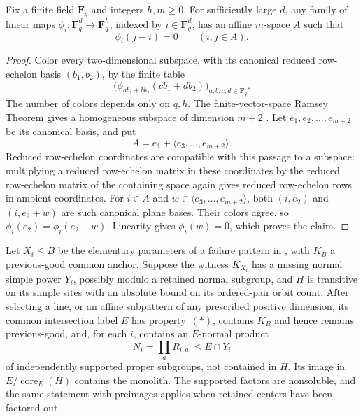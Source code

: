 \begin{lemma}\label{r:affine-kernels}
Fix a finite field $\mathbf F_q$ and integers $h,m\ge0$.
For sufficiently large $d$, any family of linear maps
$\phi_i:\mathbf F_q^d\longrightarrow\mathbf F_q^h$, indexed by
$i\in\mathbf F_q^d$, has an affine $m$-space $A$ such that
\[
 \phi_i(j-i)=0\qquad(i,j\in A).
\]
\end{lemma}

\begin{proof}
Color every two-dimensional subspace, with its canonical reduced
row-echelon basis $(b_1,b_2)$, by the finite table
\[
 \bigl(\phi_{a b_1+b b_2}(c b_1+d b_2)\bigr)_{a,b,c,d\in\mathbf F_q}.
\]
The number of colors depends only on $q,h$.  The finite-vector-space Ramsey Theorem gives a homogeneous subspace of dimension $m+2$
\citep{GrahamLeebRothschild1972,GrahamLeebRothschild1973}.
Let $e_1,e_2,\ldots,e_{m+2}$ be its canonical basis, and put
\[
 A=e_1+\langle e_3,\ldots,e_{m+2}\rangle.
\]
Reduced row-echelon coordinates are compatible with this passage to
a subspace: multiplying a reduced row-echelon matrix in these
coordinates by the reduced row-echelon matrix of the containing
space again gives reduced row-echelon rows in ambient coordinates.
For $i\in A$ and $w\in\langle e_3,\ldots,e_{m+2}\rangle$, both
$(i,e_2)$ and $(i,e_2+w)$ are such canonical plane bases.
Their colors agree, so $\phi_i(e_2)=\phi_i(e_2+w)$.
Linearity gives $\phi_i(w)=0$, which proves the claim.
\end{proof}

\begin{lemma}
\label{r:supported-products}
Let $X_i\le B$ be the elementary parameters of a failure pattern in
, with $K_B$ a previous-good common anchor.
Suppose the witness
$K_{X_i}$ has a missing normal simple power $Y_i$, possibly modulo
a retained normal subgroup, and $H$ is transitive on its simple sites
with an absolute bound on its ordered-pair orbit count.  After
selecting a line, or an affine subpattern of any prescribed positive
dimension, its common intersection label $E$ has property~\((*)\),
contains $K_B$ and hence remains previous-good, and, for each $i$,
contains an $E$-normal product
\[
 N_i=\prod_a R_{i,a}\ \le E\cap Y_i
\]
of independently supported proper subgroups, not contained in $H$.
Its image in $E/\operatorname{core}_E(H)$ contains the monolith.
The supported factors are nonsoluble, and the same statement with
preimages applies when retained centers have been factored out.
\end{lemma}

